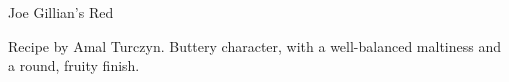 \begin{recipe}{Joe Gillian's Red}

\begin{aboutblock}
Recipe by Amal Turczyn. Buttery character, with a well-balanced maltiness and
a round, fruity finish. \sourceaha
\end{aboutblock}


\begin{methodandtiming}
 
\begin{mashsteps}
\end{mashsteps}

\begin{fermentationsteps}
\end{fermentationsteps}

\end{methodandtiming}

\recipebreak

\begin{ingredientsblock}

\begin{malts}
\end{malts}

\begin{hops}
\end{hops}


\end{ingredientsblock}

\end{recipe}

